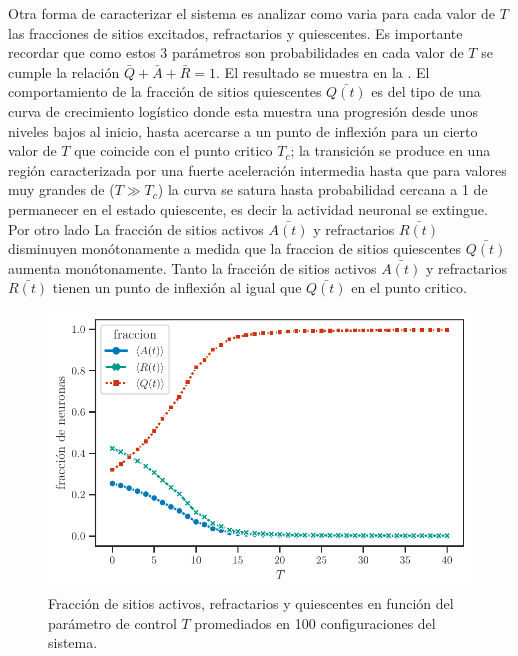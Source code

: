 Otra forma de caracterizar el sistema es  analizar como varia para cada valor de $T$ las fracciones de sitios excitados, refractarios y quiescentes.  Es importante recordar que como estos 3 parámetros son probabilidades en cada valor de $T$ se cumple la relación $\bar{Q} + \bar{A} +\bar{R} = 1$.  El resultado se muestra en la . El comportamiento de la fracción de sitios quiescentes $\bar{Q(t)}$ es del tipo de una curva de crecimiento logístico  donde esta muestra una progresión  desde unos niveles bajos al inicio, hasta acercarse a un punto de inflexión para un cierto valor de $T$ que coincide con el punto critico $T_c$; la transición se produce en una región caracterizada por una fuerte aceleración intermedia hasta que para valores muy grandes de ($T \gg T_c$)  la curva  se satura hasta probabilidad cercana a 1 de permanecer en el estado quiescente, es decir la actividad neuronal se extingue.  Por otro lado La fracción  de sitios activos $\bar{A(t)}$ y refractarios $\bar{R(t)}$ disminuyen monótonamente a medida que la fraccion de sitios quiescentes  $\bar{Q(t)}$ aumenta monótonamente. Tanto la fracción de sitios activos $\bar{A(t)}$ y refractarios $\bar{R(t)}$ tienen un punto de inflexión al igual que   $\bar{Q(t)}$ en el punto critico.



\begin{figure}[h!]
	\centering\includegraphics[width=\imsize]{fraccion_de_sitios.pdf}
	\caption[Fracción de sitios activos, refractarios y quiescentes en función del parámetro de control $T$ promediados en  100 configuraciones del sistema .]{Fracción de sitios activos, refractarios y quiescentes en función del parámetro de control $T$ promediados en  100 configuraciones del sistema.}\label{fig:fraccion_sitios}
\end{figure}



